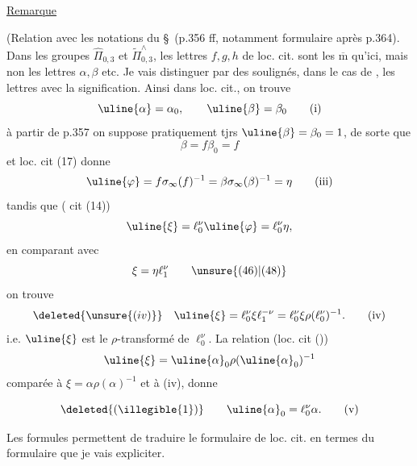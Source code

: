 \uline{Remarque}

(Relation avec les notations du \S\, (p.356 ff, notamment formulaire après p.364). Dans les groupes $\widehat{\Pi}_{0,3}$ et $\widetilde{\Pi}_{0,3}^{\wedge}$, les lettres $f,g,h$ de loc. cit. sont les $\overline{\mathrm m}$ qu'ici, mais non les lettres $\alpha,\beta$ etc. Je vais distinguer par des soulignés, dans le cas de  , les lettres avec la  signification. Ainsi dans loc. cit., on trouve
\[
\uline{\alpha}=\alpha_0,\qquad\uline{\beta}=\beta_0
\tag{i}
\]
à partir de p.357 on suppose pratiquement tjrs $\uline{\beta}=\beta_0=1$,  de sorte que
\[
\boxed{\beta=f\beta_0=f}
\tag{ii}
\]
 et loc. cit (17) donne
\[
\uline{\varphi}=f\sigma_\infty(f)^{-1}=\beta\sigma_\infty(\beta)^{-1}=\eta
\tag{iii}
\]
tandis que ( cit (14))
\[
\uline{\xi}=\ell_0^\nu\uline{\varphi}=\ell_0^\nu\eta,
\]
en comparant avec
\[
\xi=\eta\ell_1^\nu\qquad\unsure{(46)|(48)}
\]
on trouve
\[
\deleted{\unsure{(iv)}}\quad\uline{\xi}=\ell_0^\nu\xi\ell_1^{-\nu}
=\ell_0^\nu\xi\rho(\ell_0^\nu)^{-1}.
\tag{iv}
\]
i.e. $\uline{\xi}$ est le $\rho$-transformé de $\ell_0^\nu$.
La relation (loc. cit ())
\[
\uline{\xi}=\uline{\alpha}_0\rho(\uline{\alpha}_0)^{-1}
\]
comparée à $\xi=\alpha\rho(\alpha)^{-1}$ et à (iv), donne


\[
\deleted{(\illegible{1})}\qquad\uline{\alpha}_0=\ell_0^\nu\alpha.
\tag{v}
\]

Les formules   permettent de traduire le formulaire de loc. cit. en termes du formulaire que je vais expliciter.

